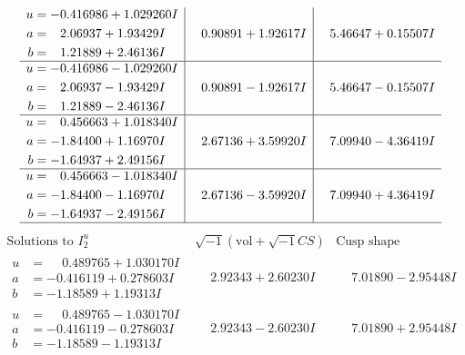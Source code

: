 \documentclass[1p]{elsarticle_modified}
\theoremstyle{definition}
\newcommand{\I}{\sqrt{-1}}
\begin{document}
$$\begin{array}{c|c|c}
\begin{aligned}
u &= -0.416986 + 1.029260 I \\
a &= \phantom{-}2.06937 + 1.93429 I \\
b &= \phantom{-}1.21889 + 2.46136 I\end{aligned}
 & \phantom{-}0.90891 + 1.92617 I & \phantom{-}5.46647 + 0.15507 I \\ \hline\begin{aligned}
u &= -0.416986 - 1.029260 I \\
a &= \phantom{-}2.06937 - 1.93429 I \\
b &= \phantom{-}1.21889 - 2.46136 I\end{aligned}
 & \phantom{-}0.90891 - 1.92617 I & \phantom{-}5.46647 - 0.15507 I \\ \hline\begin{aligned}
u &= \phantom{-}0.456663 + 1.018340 I \\
a &= -1.84400 + 1.16970 I \\
b &= -1.64937 + 2.49156 I\end{aligned}
 & \phantom{-}2.67136 + 3.59920 I & \phantom{-}7.09940 - 4.36419 I \\ \hline\begin{aligned}
u &= \phantom{-}0.456663 - 1.018340 I \\
a &= -1.84400 - 1.16970 I \\
b &= -1.64937 - 2.49156 I\end{aligned}
 & \phantom{-}2.67136 - 3.59920 I & \phantom{-}7.09940 + 4.36419 I\\
 \hline 
 \end{array}$$\newpage$$\begin{array}{c|c|c}  
\text{Solutions to }I^u_{2}& \I (\text{vol} + \sqrt{-1}CS) & \text{Cusp shape}\\
 \hline 
\begin{aligned}
u &= \phantom{-}0.489765 + 1.030170 I \\
a &= -0.416119 + 0.278603 I \\
b &= -1.18589 + 1.19313 I\end{aligned}
 & \phantom{-}2.92343 + 2.60230 I & \phantom{-}7.01890 - 2.95448 I \\ \hline\begin{aligned}
u &= \phantom{-}0.489765 - 1.030170 I \\
a &= -0.416119 - 0.278603 I \\
b &= -1.18589 - 1.19313 I\end{aligned}
 & \phantom{-}2.92343 - 2.60230 I & \phantom{-}7.01890 + 2.95448 I \\ \hline\begin{aligned}

\end{aligned}
\end{array}$$
\end{document}
